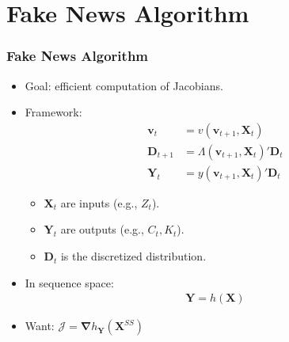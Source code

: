 \documentclass[english,xcolor=svgnames]{beamer}
\begin{document}

\section{Fake News Algorithm}

\begin{frame}
    \frametitle{Fake News Algorithm}
    \begin{itemize}
        \item Goal: efficient computation of Jacobians.
        \item Framework:
        \begin{align*}
        	\bm{v}_t &= v(\bm{v}_{t+1},\bm{X}_t) \\
        	\bm{D}_{t+1} &= \Lambda(\bm{v}_{t+1},\bm{X}_t)'\bm{D}_{t} \\
        	\bm{Y}_{t} &= y(\bm{v}_{t+1},\bm{X}_t)'\bm{D}_{t} 
        \end{align*}
        \begin{itemize}
        	\item $\bm{X}_t$ are inputs (e.g., $Z_t$).
        	\item $\bm{Y}_t$ are outputs (e.g., $C_t, K_t$).
        	\item $\bm{D}_t$ is the discretized distribution.
        \end{itemize}
        \item In sequence space:
        \begin{align*}
        	\bm{Y} = h(\bm{X})
        \end{align*}
        \item Want: $\mathcal{J} = \pmb\nabla h_{\bm{Y}}(\bm{X}^{SS})$
      \end{itemize}
\end{frame}
\end{document}

